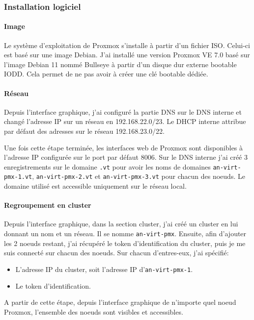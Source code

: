 \documentclass[12pt]{article}
\begin{document}
\subsubsection{Installation logiciel}
\paragraph{Image}
Le système d'exploitation de Proxmox s'installe à partir d'un fichier ISO. Celui-ci est basé sur une image Debian. 
J'ai installé une version Proxmox VE 7.0 basé sur l'image Debian 11 nommé Bullseye à partir d'un disque dur externe bootable IODD. 
Cela permet de ne pas avoir à créer une clé bootable dédiée.

\paragraph{Réseau}
Depuis l'interface graphique, j'ai configuré la partie DNS sur le DNS interne et changé l'adresse IP sur un réseau en 192.168.22.0/23. 
Le DHCP interne attribue par défaut des adresses sur le réseau 192.168.23.0/22.

Une fois cette étape terminée, les interfaces web de Proxmox sont disponibles à l'adresse IP configurée sur le port par défaut 8006.
Sur le DNS interne j'ai créé 3 enregistrements sur le domaine \verb|.vt| pour avoir les noms de domaines \verb|an-virt-pmx-1.vt|, \verb|an-virt-pmx-2.vt| et \verb|an-virt-pmx-3.vt| pour chacun des noeuds.
Le domaine utilisé est accessible uniquement sur le réseau local.

\paragraph{Regroupement en cluster}
Depuis l'interface graphique, dans la section cluster, j'ai créé un cluster en lui donnant un nom et un réseau. Il se nomme \verb|an-virt-pmx|.
Ensuite, afin d'ajouter les 2 noeuds restant, j'ai récupéré le token d'identification du cluster, puis je me suis connecté sur chacun des noeuds. 
Sur chacun d'entres-eux, j'ai spécifié:
\begin{itemize}
    \item L'adresse IP du cluster, soit l'adresse IP d'\verb|an-virt-pmx-1|.
    \item Le token d'identification.
\end{itemize}

A partir de cette étape, depuis l'interface graphique de n'importe quel noeud Proxmox, l'ensemble des noeuds sont visibles et accessibles.
\end{document}
